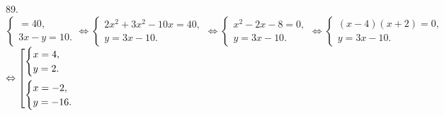 89. $\begin{cases}
    =40,\\
3x-y=10.
\end{cases}\Leftrightarrow
\begin{cases}
2x^2+3x^2-10x=40,\\
y=3x-10.
\end{cases}\Leftrightarrow
\begin{cases}
x^2-2x-8=0,\\
y=3x-10.
\end{cases}\Leftrightarrow
\begin{cases}
(x-4)(x+2)=0,\\
y=3x-10.
\end{cases}$\\$\Leftrightarrow\left[
      \begin{gathered} \begin{cases}x=4,\\ y=2.\end{cases}\hfill\\
      \begin{cases}x=-2,\\ y=-16.\end{cases}\hfill \end{gathered}\right.$\\
